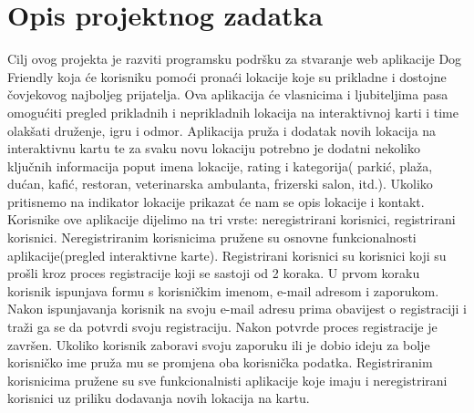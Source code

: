 \chapter{Opis projektnog zadatka}
		
		Cilj ovog projekta je razviti programsku podršku za stvaranje web aplikacije Dog Friendly koja će korisniku pomoći pronaći lokacije koje su prikladne i dostojne čovjekovog najboljeg prijatelja. Ova aplikacija  će vlasnicima i ljubiteljima pasa omogućiti pregled prikladnih i neprikladnih lokacija na interaktivnoj karti i time olakšati  druženje, igru i odmor.
		Aplikacija  pruža i dodatak novih lokacija na interaktivnu kartu te za svaku novu lokaciju potrebno je dodatni nekoliko ključnih informacija poput imena lokacije, rating i kategorija( parkić, plaža, dućan, kafić, restoran, veterinarska
		ambulanta, frizerski salon, itd.). Ukoliko pritisnemo na indikator lokacije prikazat će nam se opis lokacije i kontakt. 
		Korisnike ove aplikacije dijelimo na tri vrste: neregistrirani korisnici, registrirani korisnici. Neregistriranim korisnicima pružene su osnovne funkcionalnosti aplikacije(pregled interaktivne karte). Registrirani korisnici su korisnici koji su prošli kroz proces registracije koji se sastoji od 2 koraka. U prvom koraku korisnik ispunjava formu s korisničkim imenom, e-mail adresom i zaporukom. Nakon ispunjavanja korisnik na svoju e-mail adresu prima obavijest o registraciji i traži ga se da potvrdi svoju registraciju. Nakon potvrde proces registracije je završen. Ukoliko korisnik zaboravi svoju zaporuku ili je dobio ideju za bolje korisničko ime pruža mu se promjena oba korisnička podatka. Registriranim korisnicima pružene su sve funkcionalnisti aplikacije koje imaju i neregistrirani korisnici uz priliku dodavanja novih lokacija na kartu.
		\eject
		
	